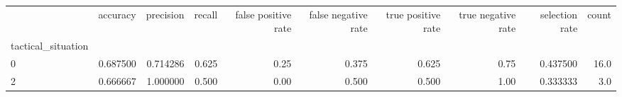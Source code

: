 \begin{tabular}{lrrrrrrrrr}
\toprule
{} &  accuracy &  precision &  recall &  false positive rate &  false negative rate &  true positive rate &  true negative rate &  selection rate &  count \\
tactical\_situation &           &            &         &                      &                      &                     &                     &                 &        \\
\midrule
0                  &  0.687500 &   0.714286 &   0.625 &                 0.25 &                0.375 &               0.625 &                0.75 &        0.437500 &   16.0 \\
2                  &  0.666667 &   1.000000 &   0.500 &                 0.00 &                0.500 &               0.500 &                1.00 &        0.333333 &    3.0 \\
\bottomrule
\end{tabular}
